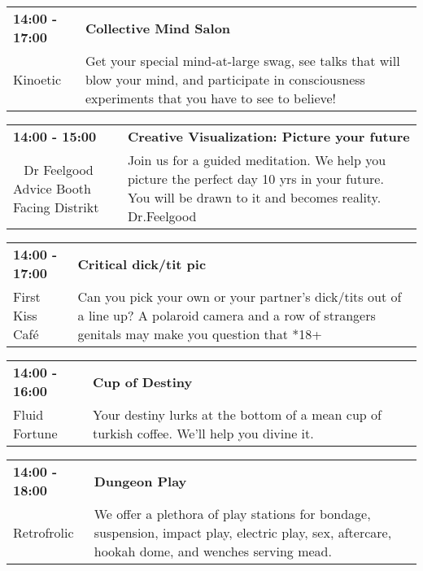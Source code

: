 \begin{tabular}{ p{1in} p{2.2in} }
    \textbf{14:00 - 17:00} & \textbf{Collective Mind Salon} \\
    Kinoetic \newline  & Get your special mind-at-large swag, see talks that will blow your mind, and participate in consciousness experiments that you have to see to believe! \\
    \hline 
\end{tabular}
    
\begin{tabular}{ p{1in} p{2.2in} }
    \textbf{14:00 - 15:00} & \textbf{Creative Visualization: Picture your future} \\
    ~ \newline Dr Feelgood Advice Booth Facing Distrikt & Join us for a guided meditation. We help you picture the perfect day 10 yrs in your future. You will be drawn to it and becomes reality.
Dr.Feelgood \\
    \hline 
\end{tabular}
    
\begin{tabular}{ p{1in} p{2.2in} }
    \textbf{14:00 - 17:00} & \textbf{Critical dick/tit pic} \\
    First Kiss Caf\'e \newline  & Can you pick your own or your partner's dick/tits out of a line up?  A polaroid camera and a row of strangers genitals may make you question that *18+ \\
    \hline 
\end{tabular}
    
\begin{tabular}{ p{1in} p{2.2in} }
    \textbf{14:00 - 16:00} & \textbf{Cup of Destiny} \\
    Fluid Fortune \newline  & Your destiny lurks at the bottom of a mean cup of turkish coffee. We'll help you divine it. \\
    \hline 
\end{tabular}
    
\begin{tabular}{ p{1in} p{2.2in} }
    \textbf{14:00 - 18:00} & \textbf{Dungeon Play} \\
    Retrofrolic \newline  & We offer a plethora of play stations for bondage, suspension, impact play, electric play, sex, aftercare, hookah dome, and wenches serving mead. \\
    \hline 
\end{tabular}
    
